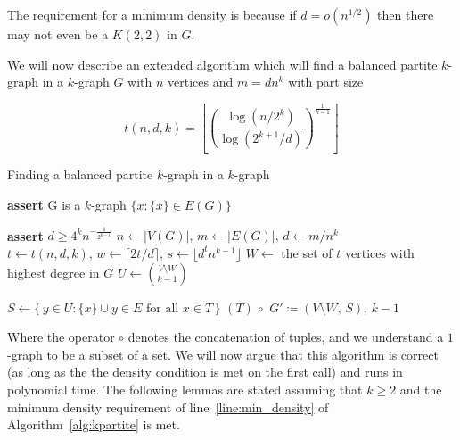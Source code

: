 \begin{remark}
    The requirement for a minimum density is because if $d = o\left(n^{1/2}\right)$ then
    there may not even be a $K(2, 2)$ in $G$. %
\end{remark}

We will now describe an extended algorithm which will find a balanced partite $k$-graph in a $k$-graph $G$ with
$n$ vertices and $m = d n^k$ with part size

\[
    t (n, d, k) = \left\lfloor \left(  \frac{\log (n/2^k)}{\log (2^{k+1}/d)} \right)^{\frac{1}{k-1}} \right\rfloor
\]

\begin{algorithm}
    \caption{Finding a balanced partite $k$-graph in a $k$-graph}
    \label{alg:kpartite}
    \begin{algorithmic}[1]
            \State \textbf{assert} G is a $k$-graph
                \State \Return $\{x : \{x\} \in E(G)\}$
            \EndIf

            \State \textbf{assert} $d \geq 4^k n^{-\frac{1}{2^{k-1}}}$ \label{line:min_density}
            \State $n \gets |V(G)|,\, m \gets |E(G)|,\, d \gets m/n^k$
            \State $t \gets t(n, d, k),\, w \gets \lceil 2t/d \rceil,\, s \gets \lfloor d^t n^{k-1} \rfloor$ \label{line:tws}
            \State $W \gets$ the set of $t$ vertices with highest degree in $G$ \label{line:W}
            \State $U \gets \binom{V\setminus W}{k-1}$

             \label{line:for}
                \State $S \gets \{\,y \in U : \{x\} \cup y \in E \text{ for all } x \in T\,\}$
                    \State \Return $(T)\, \circ $
                    {$G' \coloneqq (V \setminus W,\, S),\, k-1$} \label{line:return}
                \EndIf
            \EndFor
        \EndFunction
    \end{algorithmic}
\end{algorithm}

Where the operator $\circ$ denotes the concatenation of tuples, and we
understand a $1$-graph to be a subset of a set.
We will now argue that this algorithm is correct (as long as the the density condition is met on the first call)
and runs in polynomial time.
The following lemmas are stated assuming that $k \geq 2$ and
the minimum density requirement of line~\ref{line:min_density} of Algorithm~\ref{alg:kpartite} is met.

